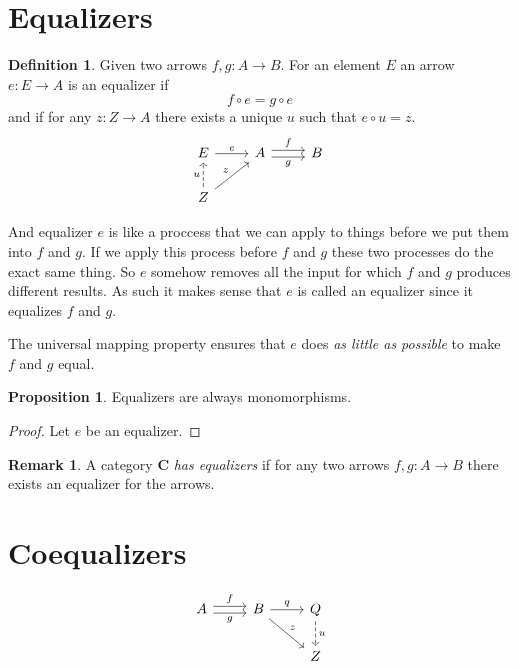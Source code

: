 \documentclass{book}
\theoremstyle{definition}
\newtheorem{definition}{Definition}[section]
\newtheorem{proposition}{Proposition}
\newtheorem*{remark}{Remark}
\begin{document}
\section{Equalizers}

\begin{definition}
  Given two arrows $f, g : A \to B$. For an element $E$ an arrow $e : E \to A$ is an
  equalizer if
  \[
    f \circ e = g \circ e
  \]
  and if for any $z : Z \to A$ there exists a unique $u$ such that $e \circ u = z$.
  \[
    \begin{tikzcd}
      E \ar[r, "e"] & A \ar[r, shift left, "f"] \ar[r, shift right, "g"'] & B \\
      Z \ar[u, dashrightarrow, "u"] \ar[ur, "z"]
    \end{tikzcd}
  \]
\end{definition}

And equalizer $e$ is like a proccess that we can apply to things before we put
them into $f$ and $g$. If we apply this process before $f$ and $g$ these two
processes do the exact same thing. So $e$ somehow removes all the input for
which $f$ and $g$ produces different results. As such it makes sense that $e$ is
called an equalizer since it equalizes $f$ and $g$.

The universal mapping property ensures that $e$ does \emph{as little as
  possible} to make $f$ and $g$ equal.

\begin{proposition}
  Equalizers are always monomorphisms.
\end{proposition}
\begin{proof}
  Let $e$ be an equalizer. %
\end{proof}

\begin{remark}
  A category \textbf{C} \emph{has equalizers} if for any two arrows
  $f, g : A \to B$ there exists an equalizer for the arrows.
\end{remark}

\section{Coequalizers}

\[
  \begin{tikzcd}
    A \ar[r, shift left, "f"] \ar[r, shift right, "g"'] & B \ar[r, "q"] \ar[rd, "z"] & Q \ar[d, dashrightarrow, "u"] \\
    & & Z
  \end{tikzcd}
\]
\end{document}
